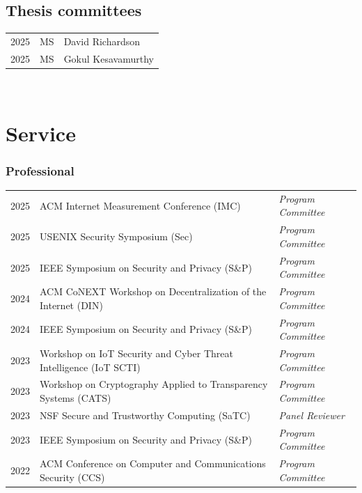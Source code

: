 \documentclass[10pt,singlecolumn]{article} %
\begin{document}
\subsection*{Thesis committees}

\begin{tabular}{rll}
2025 & MS & David Richardson \\ 
2025 & MS & Gokul Kesavamurthy \\

\end{tabular}\\



\section{Service}

\subsubsection*{Professional}

\begin{tabular}{rll}
2025 & ACM Internet Measurement Conference (IMC) & \emph{Program Committee} \\ 
2025 & USENIX Security Symposium (Sec) & \emph{Program Committee} \\ 
2025 & IEEE Symposium on Security and Privacy (S\&P) & \emph{Program Committee} \\ 
2024 & ACM CoNEXT Workshop on Decentralization of the Internet (DIN) & \emph{Program Committee} \\ 
2024 & IEEE Symposium on Security and Privacy (S\&P) & \emph{Program Committee} \\ 
2023 & Workshop on IoT Security and Cyber Threat Intelligence (IoT SCTI) & \emph{Program Committee} \\
2023 & Workshop on Cryptography Applied to Transparency Systems (CATS) & \emph{Program Committee} \\ 
2023 & NSF Secure and Trustworthy Computing (SaTC) & \emph{Panel Reviewer} \\
2023 & IEEE Symposium on Security and Privacy (S\&P) & \emph{Program Committee} \\ 
2022 & ACM Conference on Computer and Communications Security (CCS) & \emph{Program Committee} \\
\end{tabular} \\
\end{document}
